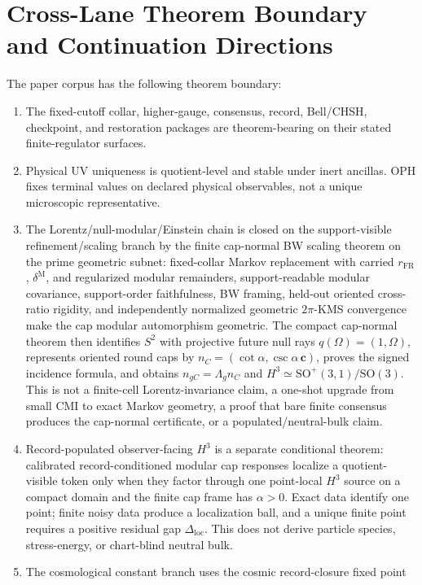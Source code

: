 \section{Cross-Lane Theorem Boundary and Continuation Directions}

The paper corpus has the following theorem boundary:

\begin{enumerate}[leftmargin=2em]
\item The fixed-cutoff collar, higher-gauge, consensus, record, Bell/CHSH, checkpoint, and
restoration packages are theorem-bearing on their stated finite-regulator surfaces.
\item Physical UV uniqueness is quotient-level and stable under inert ancillas. OPH fixes terminal
values on declared physical observables, not a unique microscopic representative.
\item The Lorentz/null-modular/Einstein chain is closed on the support-visible refinement/scaling
branch by the finite cap-normal BW scaling theorem on the prime geometric subnet: fixed-collar
Markov replacement with carried \(r_{\mathrm{FR}}\), \(\delta^{\mathrm M}\), and regularized
modular remainders, support-readable modular covariance, support-order faithfulness, BW framing,
held-out oriented cross-ratio rigidity, and independently normalized geometric \(2\pi\)-KMS
convergence make the cap modular automorphism geometric. The compact cap-normal theorem then
identifies \(S^2\) with projective future null rays \(q(\Omega)=(1,\Omega)\), represents
oriented round caps by \(n_C=(\cot\alpha,\csc\alpha\,\mathbf c)\), proves the signed incidence
formula, and obtains \(n_{gC}=\Lambda_gn_C\) and
\(H^3\simeq\mathrm{SO}^+(3,1)/\mathrm{SO}(3)\). This is not a finite-cell
Lorentz-invariance claim, a one-shot upgrade from small CMI to exact Markov geometry, a proof
that bare finite consensus produces the cap-normal certificate, or a populated/neutral-bulk
claim.
\item Record-populated observer-facing \(H^3\) is a separate conditional theorem: calibrated
record-conditioned modular cap responses localize a quotient-visible token only when they factor
through one point-local \(H^3\) source on a compact domain and the finite cap frame has
\(\alpha>0\). Exact data identify one point; finite noisy data produce a localization ball, and a
unique finite point requires a positive residual gap \(\Delta_{\mathrm{loc}}\). This does not
derive particle species, stress-energy, or chart-blind neutral bulk.
\item The cosmological constant branch uses the cosmic record-closure fixed point

\end{enumerate}
